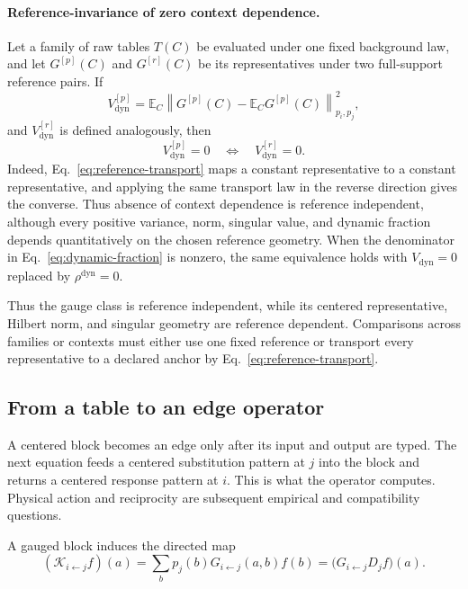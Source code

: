 \documentclass[10pt]{article}
\newcommand{\E}{\mathbb E}
\theoremstyle{definition}
\theoremstyle{remark}
\newcommand{\BookSection}[1]{\subsection{#1}}
\begin{document}
\paragraph{Reference-invariance of zero context dependence.}
\label{rem:zero-dynamic-reference-invariance}
Let a family of raw tables $T(C)$ be evaluated under one fixed background law, and let
$G^{[p]}(C)$ and $G^{[r]}(C)$ be its representatives under two full-support reference pairs.  If
\begin{equation}
V_{\mathrm{dyn}}^{[p]}
=\E_C\left\|G^{[p]}(C)-\E_CG^{[p]}(C)\right\|_{p_i,p_j}^2,
\end{equation}
and $V_{\mathrm{dyn}}^{[r]}$ is defined analogously, then
\begin{equation}
\boxed{V_{\mathrm{dyn}}^{[p]}=0
\quad\Longleftrightarrow\quad
V_{\mathrm{dyn}}^{[r]}=0.}
\label{eq:zero-dynamic-reference-invariance}
\end{equation}
Indeed, Eq.~\ref{eq:reference-transport} maps a constant representative to a constant
representative, and applying the same transport law in the reverse direction gives the converse.
Thus absence of context dependence is reference independent, although every positive variance,
norm, singular value, and dynamic fraction depends quantitatively on the chosen reference
geometry.  When the denominator in Eq.~\ref{eq:dynamic-fraction} is nonzero, the same equivalence
holds with $V_{\mathrm{dyn}}=0$ replaced by $\rho^{\mathrm{dyn}}=0$.

Thus the gauge class is reference independent, while its centered representative, Hilbert norm,
and singular geometry are reference dependent.  Comparisons across families or contexts must
either use one fixed reference or transport every representative to a declared anchor by
Eq.~\ref{eq:reference-transport}.

\BookSection{From a table to an edge operator}

A centered block becomes an edge only after its input and output are typed.  The next equation feeds
a centered substitution pattern at $j$ into the block and returns a centered response pattern at
$i$.  This is what the operator computes.  Physical action and reciprocity are subsequent empirical
and compatibility questions.

A gauged block induces the directed map
\begin{equation}
(\mathcal K_{i\leftarrow j}f)(a)
=\sum_b p_j(b)G_{i\leftarrow j}(a,b)f(b)
=\bigl(G_{i\leftarrow j}D_jf\bigr)(a).
\label{eq:edge-operator}
\end{equation}
\end{document}
